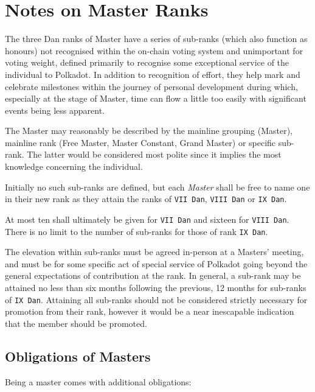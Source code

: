 \documentclass[9pt,oneside]{amsart}
\begin{document}
\section{Notes on Master Ranks}\label{notes-on-master-ranks}

The three Dan ranks of Master have a series of sub-ranks (which also function as honours) not recognised within the on-chain voting system and unimportant for voting weight, defined primarily to recognise some exceptional service of the individual to Polkadot. In addition to recognition of effort, they help mark and celebrate milestones within the journey of personal development during which, especially at the stage of Master, time can flow a little too easily with significant events being less apparent.

The Master may reasonably be described by the mainline grouping (Master), mainline rank (Free Master, Master Constant, Grand Master) or specific sub-rank. The latter would be considered most polite since it implies the most knowledge concerning the individual.

Initially no such sub-ranks are defined, but each \emph{Master} shall be free to name one in their new rank as they attain the ranks of \texttt{VII\ Dan}, \texttt{VIII\ Dan} or \texttt{IX\ Dan}.

At most ten shall ultimately be given for \texttt{VII\ Dan} and sixteen for \texttt{VIII\ Dan}. There is no limit to the number of sub-ranks for those of rank \texttt{IX\ Dan}.

The elevation within sub-ranks must be agreed in-person at a Masters' meeting, and must be for some specific act of special service of Polkadot going beyond the general expectations of contribution at the rank. In general, a sub-rank may be attained no less than six months following the previous, 12 months for sub-ranks of \texttt{IX\ Dan}. Attaining all sub-ranks should not be considered strictly necessary for promotion from their rank, however it would be a near inescapable indication that the member should be promoted.

\subsection{Obligations of Masters}\label{obligations-of-masters}

Being a master comes with additional obligations:
\end{document}

